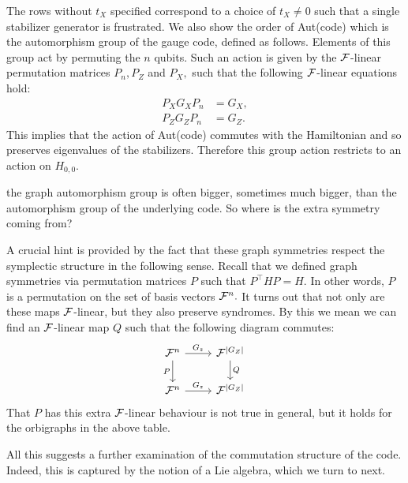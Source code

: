 The rows without $t_X$ specified correspond to a choice of $t_X\ne 0$ 
such that a single stabilizer generator is frustrated.
We also show the order of Aut(code) which is
the automorphism group of the gauge code, defined as follows.
Elements of this group act by permuting the $n$ qubits.
Such an action is given by the $\mathcal{F}$-linear
permutation matrices
$P_n, P_Z$ and $P_X,$ such that the following $\mathcal{F}$-linear equations hold:
\begin{align*}
    P_X G_X P_n &= G_X, \\
    P_Z G_Z P_n &= G_Z.
\end{align*}
This implies that the action of Aut(code)
commutes with the Hamiltonian and so preserves eigenvalues of
the stabilizers. Therefore this group action restricts to an action
on $H_{0,0}.$

\begin{framed}
the graph automorphism group is
often bigger, sometimes much bigger, than the automorphism group of
the underlying code.
So where is the extra symmetry coming from?
\end{framed}

A crucial hint is provided by the fact that these graph
symmetries respect the symplectic structure in the following sense.
Recall that we defined graph symmetries via permutation
matrices $P$ such that $P^{\top}HP=H.$
In other words, $P$ is a permutation on the set
of basis vectors $\mathcal{F}^n.$
It turns out that not only
are these maps $\mathcal{F}$-linear, but they also 
preserve syndromes. 
By this we mean we can find an $\mathcal{F}$-linear
map $Q$ such that the following diagram commutes:
\[
\begin{tikzcd}
\Field^n \arrow{r}{G_z} \arrow[swap]{d}{P} & \Field^{|G_Z|} \arrow{d}{Q} \\
\Field^n \arrow{r}{G_z} & \Field^{|G_Z|} 
\end{tikzcd}
\]
That $P$ has this extra $\mathcal{F}$-linear behaviour 
is not true in general, but it holds for the orbigraphs in the above
table.

All this suggests a further examination of the commutation structure
of the code.
Indeed, this is captured by the notion of a Lie algebra, which we turn to next.





